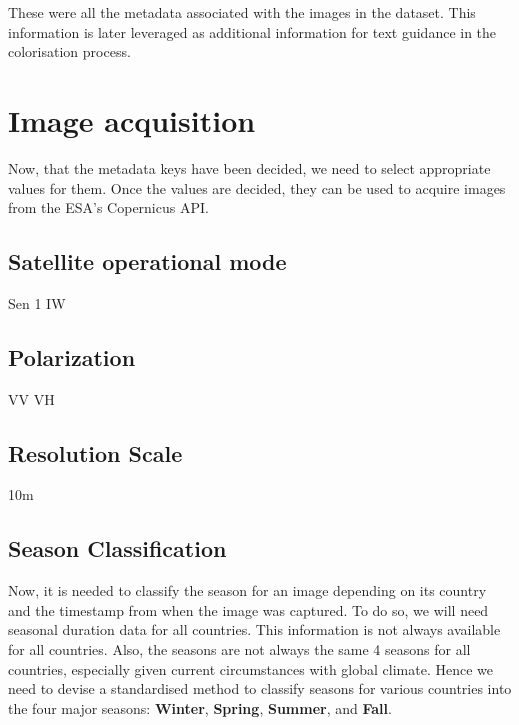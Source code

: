 These were all the metadata associated with the images in the dataset. This information is later leveraged as additional information for text guidance in the colorisation process.

\section{Image acquisition}

Now, that the metadata keys have been decided, we need to select appropriate values for them. Once the values are decided, they can be used to acquire images from the ESA's Copernicus API.

\subsection{Satellite operational mode}

Sen 1 IW

\subsection{Polarization}

VV VH

\subsection{Resolution Scale}

10m

\subsection{Season Classification}

Now, it is needed to classify the season for an image depending on its country and the timestamp from when the image was captured. To do so, we will need seasonal duration data for all countries. This information is not always available for all countries. Also, the seasons are not always the same 4 seasons for all countries, especially given current circumstances with global climate. Hence we need to devise a standardised method to classify seasons for various countries into the four major seasons: \textbf{Winter}, \textbf{Spring}, \textbf{Summer}, and \textbf{Fall}.


